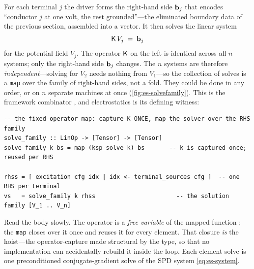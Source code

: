 For each terminal $j$ the driver forms the right-hand side $\mathbf{b}_j$ that encodes
``conductor $j$ at one volt, the rest grounded''---the eliminated boundary data of
the previous section, assembled into a vector. It then solves the linear system
\begin{equation}
  \mathsf{K}\,V_j \;=\; \mathbf{b}_j
  \label{eq:es-system}
\end{equation}
for the potential field $V_j$. The operator $\mathsf{K}$ on the left is identical across
all $n$ systems; only the right-hand side $\mathbf{b}_j$ changes. The $n$ systems are
therefore \emph{independent}---solving for $V_2$ needs nothing from $V_1$---so the
collection of solves is a \texttt{map} over the family of right-hand sides, not a
fold. They could be done in any order, or on $n$ separate machines at once
(\cref{fig:es-solvefamily}). This is the framework combinator ,
and electrostatics is its defining witness:
\begin{lstlisting}[style=l4style]
-- the fixed-operator map: capture K ONCE, map the solver over the RHS family
solve_family :: LinOp -> [Tensor] -> [Tensor]
solve_family k bs = map (ksp_solve k) bs       -- k is captured once; reused per RHS

rhss = [ excitation cfg idx | idx <- terminal_sources cfg ]  -- one RHS per terminal
vs   = solve_family k rhss                       -- the solution family [V_1 .. V_n]
\end{lstlisting}
Read the body slowly. The operator  is a \emph{free variable} of the
mapped function ; the \texttt{map} closes over it once and reuses
it for every element. That closure \emph{is} the hoist---the operator-capture made
structural by the type, so that no implementation can accidentally rebuild it
inside the loop. Each element solve  is one preconditioned
conjugate-gradient solve of the SPD system \cref{eq:es-system}.

